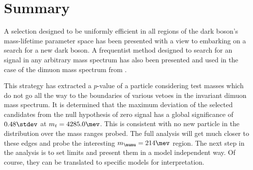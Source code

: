 \section{Summary}

A selection designed to be uniformly efficient in all regions of the dark boson's mass-lifetime
parameter space has been presented with a view to embarking on a search for a new dark boson.
A frequentist method designed to search for an signal in any arbitrary mass spectrum has also been
presented and used in the case of the dimuon mass spectrum from \btokstrmumu.

This strategy has extracted a $p$-value of a particle considering test masses which do not go all
the way to the boundaries of various vetoes in the invariant dimuon mass spectrum.
It is determined that the maximum deviation of the selected candidates from the null hypothesis of
zero signal has a global significance of $0.48\stdev$ at $m_t = 4285.0\mev$.
This is consistent with no new particle in the \mumu distribution over the mass ranges probed.
The full analysis will get much closer to these edges and probe the interesting $m_{\mumu}=214\mev$
region.
The next step in the analysis is to set limits and present them in a model independent way.
Of course, they can be translated to specific models for interpretation.



